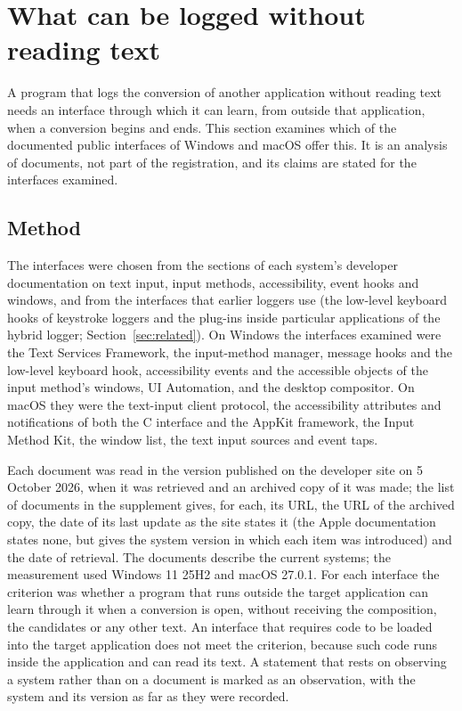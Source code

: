 
\section{What can be logged without reading text}
\label{sec:observability}

A program that logs the conversion of another application without reading text needs an interface through which
it can learn, from outside that application, when a conversion begins and ends. This section examines which of the
documented public interfaces of Windows and macOS offer this. It is an analysis of documents, not part of the
registration, and its claims are stated for the interfaces examined.

\subsection{Method}
\label{sec:observability-method}

The interfaces were chosen from the sections of each system's developer documentation on text input, input methods,
accessibility, event hooks and windows, and from the interfaces that earlier loggers use (the low-level keyboard
hooks of keystroke loggers and the plug-ins inside particular applications of the hybrid logger;
Section~\ref{sec:related}). On Windows the interfaces examined were the Text Services Framework, the input-method
manager, message hooks and the low-level keyboard hook, accessibility events and the accessible objects of the input
method's windows, UI Automation, and the desktop compositor. On macOS they were the text-input client protocol, the
accessibility attributes and notifications of both the C interface and the AppKit framework, the Input Method Kit,
the window list, the text input sources and event taps.

Each document was read in the version published on the developer site on 5 October 2026, when it was retrieved and
an archived copy of it was made; the list of documents in the supplement gives, for each, its URL, the URL of the
archived copy, the date of its last update as the site states it (the Apple documentation states none, but gives the
system version in which each item was introduced) and the date of retrieval. The documents describe the current
systems; the measurement used Windows 11 25H2 and macOS 27.0.1. For each interface the
criterion was whether a program that runs outside the target application can learn through it when a conversion is
open, without receiving the composition, the candidates or any other text. An interface that requires code to be
loaded into the target application does not meet the criterion, because such code runs inside the application and
can read its text. A statement that rests on observing a system rather than on a document is marked as an
observation, with the system and its version as far as they were recorded.

